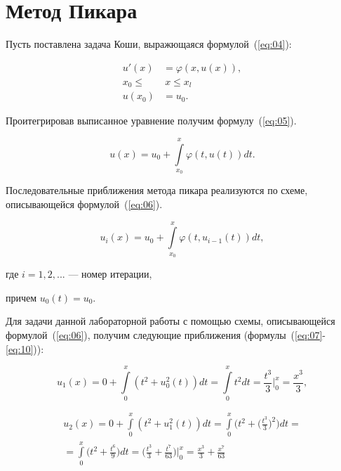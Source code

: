\section{Метод Пикара}

Пусть поставлена задача Коши, выражющаяся формулой~(\ref{eq:04}):

\begin{equation}\label{eq:04}
    \begin{aligned}
        u'(x) &= \varphi(x, u(x)),\\
        x_0 \leq &~x \leq x_l\\
        u(x_0) &= u_0.
    \end{aligned}
\end{equation}

Проитегрировав выписанное уравнение получим формулу~(\ref{eq:05}).

\begin{equation}\label{eq:05}
    u(x) = u_0 + \int\limits_{x_0}^{x}\varphi(t, u(t))dt.
\end{equation}

Последовательные приближения метода пикара реализуются по схеме,
описывающейся формулой~(\ref{eq:06}).

\begin{equation}\label{eq:06}
    u_{i}(x) = u_0 + \int\limits_{x_0}^{x}\varphi(t, u_{i - 1}(t))dt,
\end{equation}

где $i = 1, 2, ...$ --- номер итерации,

причем $u_0(t) = u_0$.

Для задачи данной лабораторной работы с помощью схемы, описывающейся
формулой~(\ref{eq:06}), получим следующие приближения
(формулы~(\ref{eq:07}-\ref{eq:10})):

\begin{equation}\label{eq:07}
    u_1(x) = 0 + \int\limits_0^x(t^2 + u_0^2(t))dt = \int\limits_0^x t^2 dt =
    \frac{t^3}{3}\bigg|_0^x = \frac{x^3}{3},
\end{equation}

\begin{equation}\label{eq:08}
    \begin{split}
    u_2(x) = 0 + \int\limits_0^x(t^2 + u_1^2(t))dt =
    \int\limits_0^x\bigg(t^2 + \bigg(\frac{t^3}{3}\bigg)^2\bigg) dt = \\
    = \int\limits_0^x\bigg(t^2 + \frac{t^6}{9}\bigg) dt =
    \bigg(\frac{t^3}{3} + \frac{t^7}{63}\bigg)\bigg|_0^x =
    \frac{x^3}{3} + \frac{x^7}{63}
    \end{split}
\end{equation}


